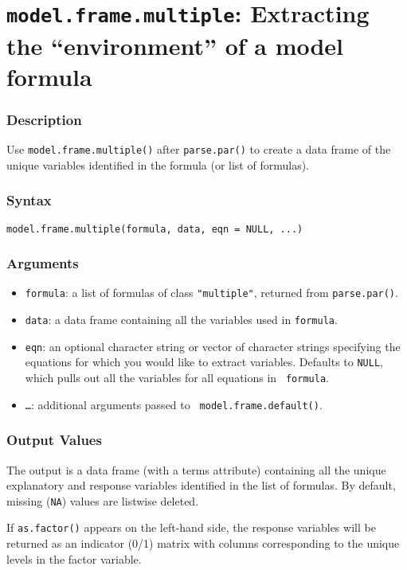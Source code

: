 \section{{\tt model.frame.multiple}: Extracting the ``environment'' of
a model formula}
\label{model.frame.multiple}

\subsubsection{Description}
Use {\tt model.frame.multiple()} after {\tt parse.par()} to create a
data frame of the unique variables identified in the formula (or list
of formulas).  
  
\subsubsection{Syntax}
\begin{verbatim}
model.frame.multiple(formula, data, eqn = NULL, ...)
\end{verbatim}

\subsubsection{Arguments}
\begin{itemize}
  \item {\tt formula}: a list of formulas of class {\tt "multiple"},
returned from {\tt parse.par()}.  
  \item {\tt data}: a data frame containing all the variables used in
{\tt formula}.  
\item {\tt eqn}: an optional character string or vector of character strings 
specifying the equations for which you would like to extract variables.  Defaults 
to {\tt NULL}, which pulls out all the variables for all equations in {\tt 
formula}.   
 \item {\tt \dots}: additional arguments passed to {\tt
model.frame.default()}.  
\end{itemize}

\subsubsection{Output Values}

The output is a data frame (with a terms attribute) containing all the
unique explanatory and response variables identified in the list of
formulas.  By default, missing ({\tt NA}) values are listwise deleted.

If {\tt as.factor()} appears on the left-hand side, the response
variables will be returned as an indicator (0/1) matrix with columns
corresponding to the unique levels in the factor variable.  
	
